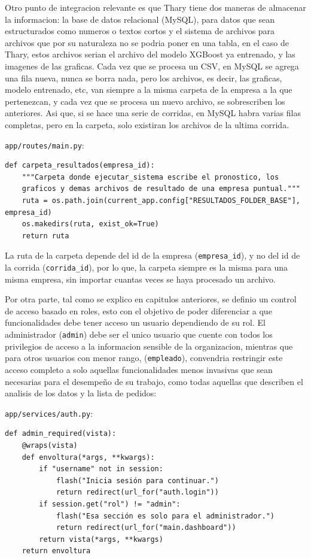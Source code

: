 Otro punto de integracion relevante es que Thary tiene dos maneras de almacenar la informacion: la base de datos relacional (MySQL), para datos que sean estructurados como numeros o textos cortos y el sistema de archivos para archivos que por su naturaleza no se podria poner en una tabla, en el caso de Thary, estos archivos serian el archivo del modelo XGBoost ya entrenado, y las imagenes de las graficas. Cada vez que se procesa un CSV, en MySQL se agrega una fila nueva, nunca se borra nada, pero los archivos, es decir, las graficas, modelo entrenado, etc, van siempre a la misma carpeta de la empresa a la que pertenezcan, y cada vez que se procesa un nuevo archivo, se sobrescriben los anteriores. Asi que, si se hace una serie de corridas, en MySQL habra varias filas completas, pero en la carpeta, solo existiran los archivos de la ultima corrida. 

\texttt{app/routes/main.py}:
\label{lst:carpeta_resultados}
\begin{verbatim}
def carpeta_resultados(empresa_id):
    """Carpeta donde ejecutar_sistema escribe el pronostico, los
    graficos y demas archivos de resultado de una empresa puntual."""
    ruta = os.path.join(current_app.config["RESULTADOS_FOLDER_BASE"], empresa_id)
    os.makedirs(ruta, exist_ok=True)
    return ruta
\end{verbatim}

La ruta de la carpeta depende del id de la empresa (\texttt{empresa\_id}), y no del id de la corrida (\texttt{corrida\_id}), por lo que, la carpeta siempre es la misma para una misma empresa, sin importar cuantas veces se haya procesado un archivo. 

Por otra parte, tal como se explico en capitulos anteriores, se definio un control de acceso basado en roles, esto con el objetivo de poder diferenciar a que funcionalidades debe tener acceso un usuario dependiendo de su rol. El administrador (\texttt{admin}) debe ser el unico usuario que cuente con todos los privilegios de acceso a la informacion sensible de la organizacion, mientras que para otros usuarios con menor rango, (\texttt{empleado}), convendria restringir este acceso completo a solo aquellas funcionalidades menos invasivas que sean necesarias para el desempeño de su trabajo, como todas aquellas que describen el analisis de los datos y la lista de pedidos: 

\texttt{app/services/auth.py}:
\label{lst:admin_required}
\begin{verbatim}
def admin_required(vista):
    @wraps(vista)
    def envoltura(*args, **kwargs):
        if "username" not in session:
            flash("Inicia sesión para continuar.")
            return redirect(url_for("auth.login"))
        if session.get("rol") != "admin":
            flash("Esa sección es solo para el administrador.")
            return redirect(url_for("main.dashboard"))
        return vista(*args, **kwargs)
    return envoltura
\end{verbatim}


